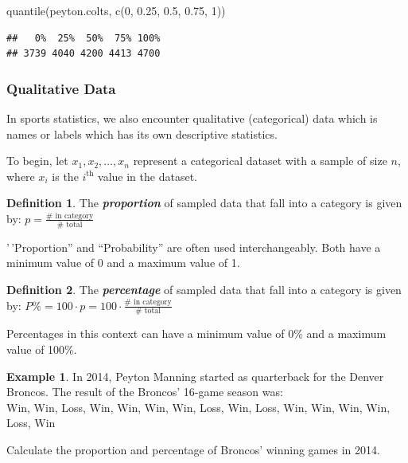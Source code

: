 \documentclass[
  11pt,
]{book}
\newenvironment{Shaded}{\begin{snugshade}}{\end{snugshade}}
\newcommand{\DecValTok}[1]{\textcolor[rgb]{0.00,0.00,0.81}{#1}}
\newcommand{\FloatTok}[1]{\textcolor[rgb]{0.00,0.00,0.81}{#1}}
\newcommand{\FunctionTok}[1]{\textcolor[rgb]{0.00,0.00,0.00}{#1}}
\newcommand{\NormalTok}[1]{#1}
\theoremstyle{definition}
\newtheorem{definition}{Definition}[chapter]
\theoremstyle{definition}
\newtheorem{example}{Example}[chapter]
\theoremstyle{definition}
\theoremstyle{definition}
\theoremstyle{remark}
\begin{document}
\begin{Shaded}
\begin{Highlighting}[]
\FunctionTok{quantile}\NormalTok{(peyton.colts, }\FunctionTok{c}\NormalTok{(}\DecValTok{0}\NormalTok{, }\FloatTok{0.25}\NormalTok{, }\FloatTok{0.5}\NormalTok{, }\FloatTok{0.75}\NormalTok{, }\DecValTok{1}\NormalTok{))}
\end{Highlighting}
\end{Shaded}

\begin{verbatim}
##   0%  25%  50%  75% 100% 
## 3739 4040 4200 4413 4700
\end{verbatim}

\vfill
\newpage

\hypertarget{qualitative-data}{%
\subsubsection{Qualitative Data}\label{qualitative-data}}

In sports statistics, we also encounter qualitative (categorical) data which is names or labels which has its own descriptive statistics.

To begin, let \(x_1, x_2, \ldots, x_n\) represent a categorical dataset with a sample of size \(n\), where \(x_i\) is the \(i^\text{th}\) value in the dataset.

\begin{definition}
The \textbf{\emph{proportion}} of sampled data that fall into a category is given by: \(p = \frac{\#\text{ in category}}{\#\text{ total}}\)
\end{definition}

'\,'Proportion'' and ``Probability'' are often used interchangeably. Both have a minimum value of 0 and a maximum value of 1.

\begin{definition}
The \textbf{\emph{percentage}} of sampled data that fall into a category is given by: \(P\% = 100 \cdot p = 100 \cdot \frac{\#\text{ in category}}{\#\text{ total}}\)
\end{definition}

Percentages in this context can have a minimum value of 0\% and a maximum value of 100\%.

\begin{example}
In 2014, Peyton Manning started as quarterback for the Denver Broncos. The result of the Broncos' 16-game season was:\\
Win, Win, Loss, Win, Win, Win, Win, Loss, Win, Loss, Win, Win, Win, Win, Loss, Win

Calculate the proportion and percentage of Broncos' winning games in 2014.
\end{example}
\end{document}
